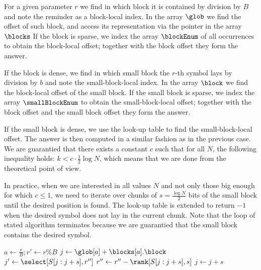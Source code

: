 For a given parameter $r$ we find in which block it is contained by division by $B$ and note the reminder as a block-local index.
In the array $\glob$ we find the offset of such block, and access its representation via the pointer in the array $\blocks$
If the block is sparse, we index the array $\blockEnum$ of all occurrences to obtain the block-local offset; together with the block offset they form the answer.

If the block is dense, we find in which small block the $r$-th symbol \ph{} lays by division by $b$ and note the small-block-local index.
In the array $\block$ we find the block-local offset of the small block.
If the small block is sparse, we index the array $\smallBlockEnum$ to obtain the small-block-local offset; together with the block offset and the small block offset they form the answer.

If the small block is dense, we use the look-up table to find the small-block-local offset.
The answer is then computed in a similar fashion as in the previous case.
We are guarantied that there exists a constant $c$ such that for all $N$, the following inequality holds: $k < c \cdot \frac{1}{2} \log N$, which means that we are done from the theoretical point of view.

In practice, when we are interested in all values $N$ and not only those big enough for which $c \le 1$, we need to iterate over chunks of $s = \frac{\log N}{2}$ bits of the small block until the desired position is found.
The look-up table is extended to return $-1$ when the desired symbol does not lay in the current chunk.
Note that the loop of stated algorithm terminates because we are guarantied that the small block contains the desired symbol.

\begin{algorithm}
\begin{algorithmic}
	\State $a \gets \frac{r}{B}; r' \gets r \% B$
		\State {}
	\Else
		\State $j \gets \glob[a] + \blocks[a].\block$
			\State {}
		\Else
			\While{$\true$}
				\State $j' \gets \select[S[j : j + s], r'']$
					\State $r'' \gets r'' - \rank[S[j : j + s], s]$
					\State $j \gets j + s$
				\Else
					\State {}
				\EndIf
			\EndWhile
		\EndIf
	\EndIf
\EndFunction
\end{algorithmic}
\end{algorithm}


